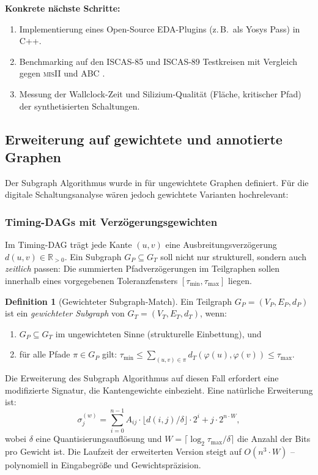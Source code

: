 ﻿\documentclass[a4paper,12pt]{article}
\theoremstyle{definition}
\newtheorem{definition}{Definition}
\begin{document}
\textbf{Konkrete nächste Schritte:}
\begin{enumerate}
  \item Implementierung eines Open-Source EDA-Plugins (z.\,B.\ als Yosys \cite{wolf2013yosys}
        Pass) in C++.
  \item Benchmarking auf den ISCAS-85 und ISCAS-89 Testkreisen
        \cite{brglez1985combinational} mit Vergleich gegen \textsc{misII} und ABC
        \cite{brayton2010abc}.
  \item Messung der Wallclock-Zeit und Silizium-Qualität (Fläche, kritischer Pfad) der
        synthetisierten Schaltungen.
\end{enumerate}

\subsection{Erweiterung auf gewichtete und annotierte Graphen}

Der Subgraph Algorithmus wurde in \cite{subgraph2026} für ungewichtete Graphen definiert.
Für die digitale Schaltungsanalyse wären jedoch gewichtete Varianten hochrelevant:

\subsubsection{Timing-DAGs mit Verzögerungsgewichten}

Im Timing-DAG trägt jede Kante $(u,v)$ eine Ausbreitungsverzögerung $d(u,v) \in \mathbb{R}_{>0}$.
Ein Subgraph $G_P \subseteq G_T$ soll nicht nur strukturell, sondern auch \emph{zeitlich}
passen: Die summierten Pfadverzögerungen im Teilgraphen sollen innerhalb eines
vorgegebenen Toleranzfensters $[\tau_{\min}, \tau_{\max}]$ liegen.

\begin{definition}[Gewichteter Subgraph-Match]\label{def:weighted_match}
  Ein Teilgraph $G_P = (V_P, E_P, d_P)$ ist ein \emph{gewichteter Subgraph} von
  $G_T = (V_T, E_T, d_T)$, wenn:
  \begin{enumerate}
    \item $G_P \subseteq G_T$ im ungewichteten Sinne (strukturelle Einbettung), und
    \item für alle Pfade $\pi \in G_P$ gilt:
          $\tau_{\min} \leq \sum_{(u,v) \in \pi} d_T(\varphi(u), \varphi(v)) \leq \tau_{\max}$.
  \end{enumerate}
\end{definition}

Die Erweiterung des Subgraph Algorithmus auf diesen Fall erfordert eine modifizierte
Signatur, die Kantengewichte einbezieht. Eine natürliche Erweiterung ist:
\[
  \sigma_j^{(w)} = \sum_{i=0}^{n-1} A_{ij} \cdot \lfloor d(i,j) / \delta \rfloor \cdot 2^i
  + j \cdot 2^{n \cdot W},
\]
wobei $\delta$ eine Quantisierungsauflösung und $W = \lceil \log_2 \tau_{\max}/\delta \rceil$
die Anzahl der Bits pro Gewicht ist. Die Laufzeit der erweiterten Version steigt auf
$O(n^3 \cdot W)$ -- polynomiell in Eingabegröße und Gewichtspräzision.
\end{document}
